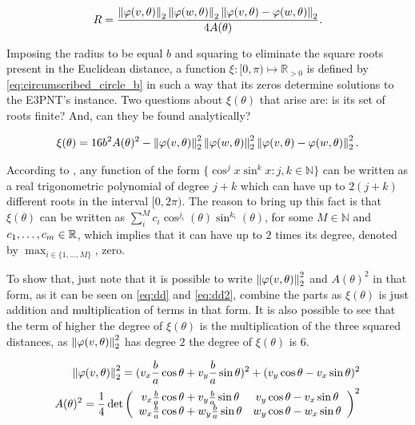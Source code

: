 \begin{equation}\label{eq:circumscribed_circle}
R = \dfrac{\left\lVert\varphi(v, \theta)\right\rVert_{2}\left\lVert\varphi(w, \theta)\right\rVert_{2}\left\lVert\varphi(v, \theta)-\varphi(w, \theta)\right\rVert_{2}   }{4A(\theta)}.
\end{equation}

Imposing the radius to be equal $b$ and squaring to eliminate the square roots present in the Euclidean distance, a function $\xi : [0, \pi) \mapsto \mathbb{R}_{>0}$ is defined by \autoref{eq:circumscribed_circle_b} in such a way that its zeros determine solutions to the E3PNT's instance. Two questions about $\xi(\theta)$ that arise are: is its set of roots finite? And, can they be found analytically?

\begin{equation}\label{eq:circumscribed_circle_b}
\xi(\theta) = 16b^2A(\theta)^2 - \left\lVert\varphi(v, \theta)\right\rVert_{2}^2\left\lVert\varphi(w, \theta)\right\rVert_{2}^2\left\lVert\varphi(v, \theta)-\varphi(w, \theta)\right\rVert_{2}^2.
\end{equation}

According to , any function of the form $\{\cos^j{x}\sin^k{x} : j, k \in \mathbb{N}\}$ can be written as a real trigonometric polynomial of degree $j+k$ which can have up to $2(j+k)$ different roots in the interval $[0, 2\pi)$. The reason to bring up this fact is that $\xi(\theta)$ can be written as $\sum_i^M c_i \cos^{j_i}(\theta)\sin^{k_i}(\theta)$, for some $M \in \mathbb{N}$ and $c_1, \dots, c_m \in \mathbb{R}$, which implies that it can have up to $2$ times its degree, denoted by $\max_{i\in \{1, \dots, M\}}$, zero.

 To show that, just note that it is possible to write $\left\lVert\varphi(v, \theta)\right\rVert_{2}^2$ and $A(\theta)^2$ in that form, as it can be seen on \autoref{eq:dd} and \autoref{eq:dd2}, combine the parts as $\xi(\theta)$ is just addition and multiplication of terms in that form. It is also possible to see that the term of higher the degree of $\xi(\theta)$ is the multiplication of the three squared distances, as $\left\lVert\varphi(v, \theta)\right\rVert_{2}^2$ has degree $2$ the degree of $\xi(\theta)$ is $6$.


\begin{align}\label{eq:dd}
	\left\lVert\varphi(v, \theta)\right\rVert_{2}^2 = (v_x\frac{b}{a}\cos\theta + v_y\frac{b}{a}\sin\theta)^2 + (v_y\cos\theta - v_x\sin\theta)^2\\
	\label{eq:dd2} A(\theta)^2=\dfrac{1}{4}\det\left(
	\begin{array}{cc}
		v_x\frac{b}{a}\cos\theta + v_y\frac{b}{a}\sin\theta&v_y\cos\theta - v_x\sin\theta\\
		w_x\frac{b}{a}\cos\theta + w_y\frac{b}{a}\sin\theta&w_y\cos\theta - w_x\sin\theta
	\end{array}\right)^2
\end{align}


